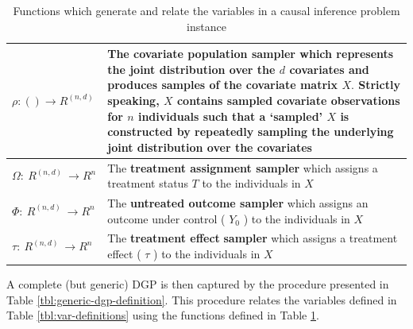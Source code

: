\documentclass[../main.tex]{subfiles}
\begin{document}
\begin{table}[H]
\begin{tabular}{|p{1.25in}|p{3.75in}|}
\hline

$\rho :  \left(  \right)   \rightarrow R^{ \left( n, d \right) }$ & The \textbf{covariate population sampler} which represents the joint distribution over the  \( d \)  covariates and produces samples of the covariate matrix  \( X. \) Strictly speaking,  \( X \) contains sampled covariate observations for  \( n \) individuals such that a ‘sampled’  \( X \) is constructed by repeatedly sampling the underlying joint distribution over the covariates \\ \hline

$ \Omega :~R^{ \left( n, d \right) }~ \rightarrow R^{n}$ & The \textbf{treatment assignment sampler} which assigns a treatment status  \( T \) to the individuals in  \( X \)  \\ \hline

$\Phi :~R^{ \left( n, d \right) }~ \rightarrow R^{n}$ & The \textbf{untreated outcome sampler} which assigns an outcome under control ( \( Y_{0} \) ) to the individuals in  \( X \) \\ \hline

$ \tau:~R^{ \left( n, d \right) }~ \rightarrow R^{n}$ & The \textbf{treatment effect} \textbf{sampler} which assigns a treatment effect ( \(  \tau \) ) to the individuals in  \( X \) \\ \hline

\end{tabular}

\caption{Functions which generate and relate the variables in a causal inference problem instance}
\label{tbl:func-definitions}
\end{table}

A complete (but generic) DGP is then captured by the procedure presented in Table \ref{tbl:generic-dgp-definition}. This procedure relates the variables defined in Table \ref{tbl:var-definitions} using the functions defined in Table \ref{tbl:func-definitions}.
\end{document}
